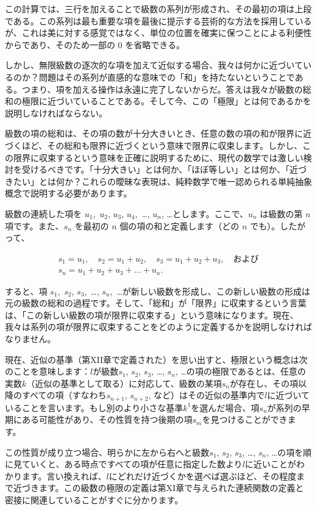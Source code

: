 \documentclass[a4paper,11pt,openany]{ltjsbook}
\begin{document}
この計算では、三行を加えることで級数の系列が形成され、その最初の項は上段である。この系列は最も重要な項を最後に提示する芸術的な方法を採用しているが、これは美に対する感覚ではなく、単位の位置を確実に保つことによる利便性からであり、そのため一部の $0$ を省略できる。

しかし、無限級数の逐次的な項を加えて近似する場合、我々は何かに近づいているのか？問題はその系列が直感的な意味での「和」を持たないということである。つまり、項を加える操作は永遠に完了しないからだ。答えは我々が級数の総和の極限に近づいていることである。そして今、この「極限」とは何であるかを説明しなければならない。

級数の項の総和は、その項の数が十分大きいとき、任意の数の項の和が限界に近づくほど、その総和も限界に近づくという意味で限界に収束します。しかし、この限界に収束するという意味を正確に説明するために、現代の数学では激しい検討を受けるべきです。「十分大きい」とは何か、「ほぼ等しい」とは何か、「近づきたい」とは何か？これらの曖昧な表現は、純粋数学で唯一認められる単純抽象概念で説明する必要があります。

級数の連続した項を $u_{1}$,~$u_{2}$, $u_{3}$, $u_{4}$,~\dots, $u_{n}$, \dots とします。ここで、$u_{n}$ は級数の第 $n$ 項です。また、$s_{n}$ を最初の $n$ 個の項の和と定義します（どの $n$ でも）。したがって、

\begin{gather*}
s_1 = u_1, \quad s_2 = u_1 + u_2, \quad s_3 = u_1 + u_2 + u_3, \quad \text{および} \\
s_n = u_1 + u_2 + u_3 + \dots + u_n.
\end{gather*}


すると、項 $s_{1}$,~$s_{2}$, $s_{3}$,~\dots, $s_{n}$,~\dots が新しい級数を形成し、この新しい級数の形成は元の級数の総和の過程です。そして、「総和」が「限界」に収束するという言葉は、「この新しい級数の項が限界に収束する」という意味になります。現在、我々は系列の項が限界に収束することをどのように定義するかを説明しなければなりません。

現在、近似の基準（第XII章で定義された）を思い出すと、極限という概念は次のことを意味します：$l$が級数$s_{1}$, $s_{2}$, $s_{3}$, \dots, $s_{n}$, \dots の項の極限であるとは、任意の実数$k$（近似の基準として取る）に対応して、級数の某項$s_{n}$が存在し、その項以降のすべての項（すなわち$s_{n+1}$, $s_{n+2}$, など）はその近似の基準内で$l$に近づいていることを言います。もし別のより小さな基準$k^{1}$を選んだ場合、項$s_{n}$が系列の早期にある可能性があり、その性質を持つ後期の項$s_{m}$を見つけることができます。

この性質が成り立つ場合、明らかに左から右へと級数$s_{1}$, $s_{2}$, $s_{3}$, \dots, $s_{n}$, \dots の項を順に見ていくと、ある時点ですべての項が任意に指定した数より$l$に近いことがわかります。言い換えれば、$l$にどれだけ近づくかを選べば選ぶほど、その程度まで近づきます。この級数の極限の定義は第XI章で与えられた連続関数の定義と密接に関連していることがすぐに分かります。
\end{document}
